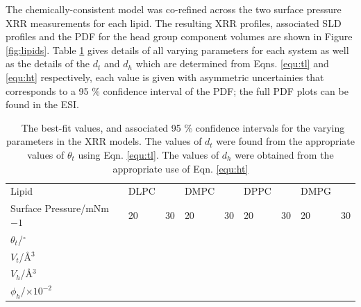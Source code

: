 \documentclass[twoside,twocolumn,9pt]{article}
\begin{document}
The chemically-consistent model was co-refined across the two surface pressure XRR measurements for each lipid. The resulting XRR profiles, associated SLD profiles and the PDF for the head group component volumes are shown in Figure \ref{fig:lipids}. Table \ref{tab:liptab} gives details of all varying parameters for each system as well as the details of the $d_t$ and $d_h$ which are determined from Eqns. \ref{equ:tl} and \ref{equ:ht} respectively, each value is given with asymmetric uncertainies that corresponds to a 95 \% confidence interval of the PDF; the full PDF plots can be found in the ESI. 
\begin{table}
	\small
	\caption{\ The best-fit values, and associated 95 \% confidence intervals for the varying parameters in the XRR models. The values of $d_t$ were found from the appropriate values of $\theta_t$ using Eqn. \ref{equ:tl}. The values of $d_h$ were obtained from the appropriate use of Eqn. \ref{equ:ht}}
	\label{tab:liptab}
	\begin{tabular*}{\textwidth}{@{\extracolsep{\fill}}lllllllll}
		\hline
		Lipid & DLPC & & DMPC & & DPPC & & DMPG & \\
		Surface Pressure/mNm${-1}$ & 20 & 30 & 20 & 30 & 20 & 30 & 20 & 30 \\
		\hline
		$\theta_t$/$^\circ$ &  &  &  &  &  &  &  &  \\
		$V_t$/\AA$^3$ &  &  &  &  &  &  &  &  \\
		$V_h$/\AA$^3$ &  &  &  &  &  &  &  &  \\
		$\phi_h$/$\times10^{-2}$ &  &  &  &  &  &  &  &  \\

\end{tabular*}
\end{table}
\end{document}

